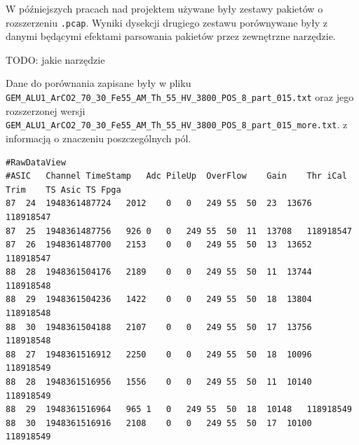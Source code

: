 \documentclass[a4paper, 12pt, twoside, openright]{article}
\begin{document}
W późniejszych pracach nad projektem używane były zestawy pakietów o rozszerzeniu \texttt{.pcap}.
Wyniki dysekcji drugiego zestawu porównywane były z danymi będącymi efektami parsowania pakietów
przez zewnętrzne narzędzie.

TODO: jakie narzędzie

Dane do porównania zapisane były w pliku \texttt{GEM\_ALU1\_ArCO2\_70\_30\_Fe55\_AM\_Th\_55\_HV\_3800\_POS\_8\_part\_015.txt} oraz
jego rozszerzonej wersji \texttt{GEM\_ALU1\_ArCO2\_70\_30\_Fe55\_AM\_Th\_55\_HV\_3800\_POS\_8\_part\_015\_more.txt}.
z informacją o znaczeniu poszczególnych pól.

\begin{lstlisting}[style=CStyle,caption={Zawartość pliku *more.txt}]
#RawDataView
#ASIC	Channel	TimeStamp	Adc	PileUp	OverFlow	Gain	Thr	iCal	Trim	TS Asic	TS Fpga
87	24	1948361487724	2012	0	0	249	55	50	23	13676	118918547
87	25	1948361487756	926	0	0	249	55	50	11	13708	118918547
87	26	1948361487700	2153	0	0	249	55	50	13	13652	118918547
88	28	1948361504176	2189	0	0	249	55	50	11	13744	118918548
88	29	1948361504236	1422	0	0	249	55	50	18	13804	118918548
88	30	1948361504188	2107	0	0	249	55	50	17	13756	118918548
88	27	1948361516912	2250	0	0	249	55	50	18	10096	118918549
88	28	1948361516956	1556	0	0	249	55	50	11	10140	118918549
88	29	1948361516964	965	1	0	249	55	50	18	10148	118918549
88	30	1948361516916	2108	0	0	249	55	50	17	10100	118918549
\end{lstlisting}
\end{document}
